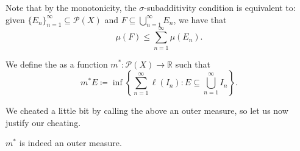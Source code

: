 \documentclass[notoc,notitlepage]{tufte-book}
\begin{document}
\begin{note}
  Note that by the monotonicity, the $\sigma$-subadditivity condition is
  equivalent to: given $\{ E_n \}_{n=1}^{\infty} \subseteq \mathcal{P}(X)$ and
  $F \subseteq \bigcup_{n=1}^{\infty} E_n$, we have that
  \begin{equation*}
    \mu(F) \leq \sum_{n=1}^{\infty} \mu(E_n).
  \end{equation*}
\end{note}

\begin{defn}\label{defn:lebesgue_outer_measure}
  We define the  as a function $m^* :
  \mathcal{P}(X) \to \mathbb{R}$ such that
  \begin{equation*}
    m^* E \coloneqq \inf \left\{ \sum_{n=1}^{\infty} \ell(I_n) : E \subseteq
    \bigcup_{n=1}^{\infty} I_n \right\}.
  \end{equation*}
\end{defn}

We cheated a little bit by calling the above an outer measure, so let us now
justify our cheating.

\begin{propo}\label{propo:validity_of_the_lebesgue_outer_measure}
  $m^*$ is indeed an outer measure.
\end{propo}
\end{document}
